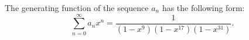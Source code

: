 

\setcounter{section}{3}
\setcounter{subsection}{1}
\setcounter{dfn}{1}

\begin{thm}
\label{thm:Dollars}
The generating function of the sequence $a_n$ has the following form:
\[
\sum_{n=0}^\infty a_n x^n = \frac{1}{(1-x^9)(1-x^{17})(1-x^{31})}.
\]
\end{thm}


